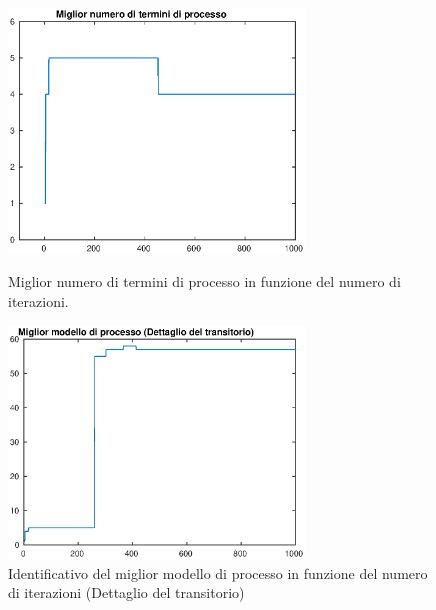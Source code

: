 \documentclass[10pt,a4paper,oneside,openany,noindent]{report}
\begin{document}
\begin{figure}[ht]
\quad
\centering
\begin{minipage}[t]{0.45\linewidth}

\includegraphics[width=0.7\textwidth]{modesk.eps} 
\caption{Miglior numero di termini di processo in funzione del numero di iterazioni.   }
\label{fig:minipage1}
\end{minipage}
\quad
\begin{minipage}[t]{0.45\linewidth}
\centering
\includegraphics[width=0.7\textwidth]{BestModelPTransitorio.eps}
\caption{Identificativo del miglior  modello di processo in funzione del numero di iterazioni (Dettaglio del transitorio)}
\label{fig:minipage2}
\end{minipage}
\end{figure}
\end{document}
